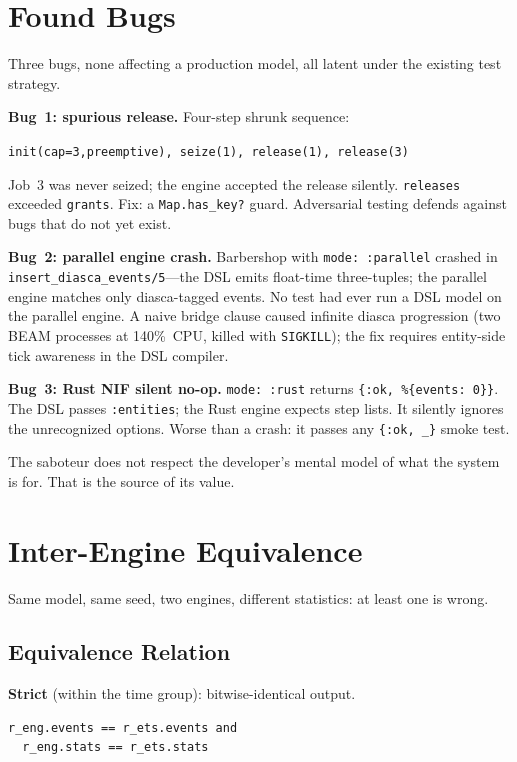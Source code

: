 \documentclass[sigplan,review,anonymous=false]{acmart}
\begin{document}
\section{Found Bugs}

Three bugs, none affecting a production model, all latent under the
existing test strategy.

\textbf{Bug~1: spurious release.} Four-step shrunk sequence:

{\footnotesize\texttt{init(cap=3,preemptive), seize(1), release(1), release(3)}}

\noindent Job~3 was never seized; the engine accepted the release
silently. \texttt{releases} exceeded \texttt{grants}. Fix: a
\texttt{Map.has\_key?} guard. Adversarial testing defends against bugs
that do not yet exist.

\textbf{Bug~2: parallel engine crash.} Barbershop with
\texttt{mode:~:parallel} crashed in
\texttt{insert\_diasca\_events/5}---the DSL emits float-time
three-tuples; the parallel engine matches only diasca-tagged events.
No test had ever run a DSL model on the parallel engine. A naive bridge
clause caused infinite diasca progression (two BEAM processes at
140\%~CPU, killed with \texttt{SIGKILL}); the fix requires entity-side
tick awareness in the DSL compiler.

\textbf{Bug~3: Rust NIF silent no-op.} \texttt{mode: :rust} returns
\texttt{\{:ok, \%\{events: 0\}\}}. The DSL passes \texttt{:entities};
the Rust engine expects step lists. It silently ignores the unrecognized
options. Worse than a crash: it passes any \texttt{\{:ok, \_\}} smoke
test.

The saboteur does not respect the developer's mental model of what the
system is for. That is the source of its value.


\section{Inter-Engine Equivalence}

Same model, same seed, two engines, different statistics: at least one
is wrong.

\subsection{Equivalence Relation}

\textbf{Strict} (within the time group): bitwise-identical output.

\begin{lstlisting}
r_eng.events == r_ets.events and
  r_eng.stats == r_ets.stats
\end{lstlisting}
\end{document}
